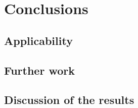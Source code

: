 \chapter{Conclusions}

\section{Applicability}
\section{Further work}
\section{Discussion of the results}
